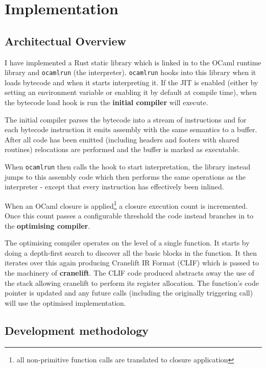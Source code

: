 \chapter{Implementation}

\section{Architectual Overview}



I have implemented a Rust static library which is linked in to the OCaml runtime library and
\texttt{ocamlrun} (the interpreter).
\texttt{ocamlrun} hooks into this library when it loads bytecode and when it starts
interpreting it.
If the JIT is enabled (either by setting an environment variable or enabling it by default at
compile time),
when the bytecode load hook is run the \textbf{initial compiler} will execute.

The initial compiler parses the bytecode into a stream of instructions and for each bytecode
instruction
it emits assembly with the same semantics to a buffer. After all code has been emitted (including
headers
and footers with shared routines) relocations are performed and the buffer is marked as executable.

When \texttt{ocamlrun} then calls the hook to start interpretation, the library instead jumps to
this assembly code which then performs the same operations as the interpreter - except that every
instruction has effectively been inlined.

When an OCaml closure is applied\footnote{all non-primitive function calls are translated to
    closure application}
a closure execution count is incremented. Once this count passes a configurable threshold the code
instead
branches in to the \textbf{optimising compiler}.

The optimising compiler operates on the level of a single function. It starts by doing a
depth-first search to discover all the basic blocks in the function. It then iterates over this
again producing Cranelift IR Format (CLIF) which is passed to the machinery of
\textbf{cranelift}. The CLIF code produced abstracts away the use of the stack allowing cranelift
to perform its register allocation. The function's code pointer is updated and any future calls
(including the originally triggering call) will use the optimised implementation.

\section{Development methodology}

